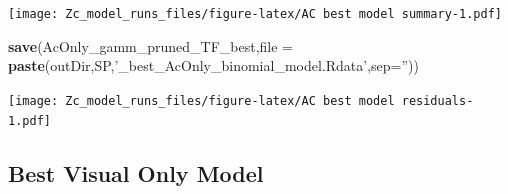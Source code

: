 \documentclass[11pt,]{article}
\newenvironment{Shaded}{\begin{snugshade}}{\end{snugshade}}
\newcommand{\KeywordTok}[1]{\textcolor[rgb]{0.13,0.29,0.53}{\textbf{{#1}}}}
\newcommand{\DataTypeTok}[1]{\textcolor[rgb]{0.13,0.29,0.53}{{#1}}}
\newcommand{\DecValTok}[1]{\textcolor[rgb]{0.00,0.00,0.81}{{#1}}}
\newcommand{\FloatTok}[1]{\textcolor[rgb]{0.00,0.00,0.81}{{#1}}}
\newcommand{\StringTok}[1]{\textcolor[rgb]{0.31,0.60,0.02}{{#1}}}
\newcommand{\CommentTok}[1]{\textcolor[rgb]{0.56,0.35,0.01}{\textit{{#1}}}}
\newcommand{\NormalTok}[1]{{#1}}
\begin{document}
\begin{Shaded}
\end{Shaded}

\texttt{[image: Zc\_model\_runs\_files/figure-latex/AC best model summary-1.pdf]}

\begin{Shaded}
\begin{Highlighting}[]
\KeywordTok{save}\NormalTok{(AcOnly_gamm_pruned_TF_best,}\DataTypeTok{file =} \KeywordTok{paste}\NormalTok{(outDir,SP,}\StringTok{'_best_AcOnly_binomial_model.Rdata'}\NormalTok{,}\DataTypeTok{sep=}\StringTok{''}\NormalTok{))}
\end{Highlighting}
\end{Shaded}

\begin{Shaded}
\end{Shaded}

\texttt{[image: Zc\_model\_runs\_files/figure-latex/AC best model residuals-1.pdf]}

\begin{Shaded}
\end{Shaded}

\subsection{Best Visual Only Model}\label{best-visual-only-model}

\begin{Shaded}
\end{Shaded}
\end{document}
